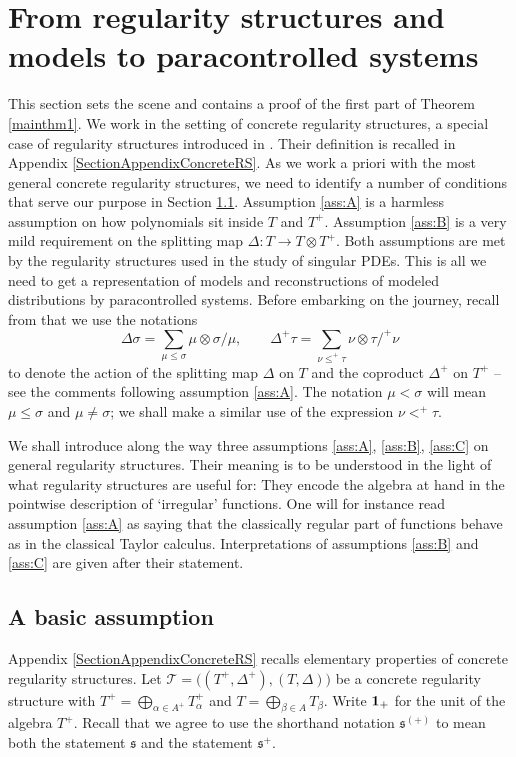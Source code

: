 \documentclass[JEP,XML,SOM,Unicode,published]{cedram}
\theoremstyle{plain}
\theoremstyle{definition}
\newcommand{\scrT}{\mathscr{T}}
\newcommand{\frks}{\mathfrak{s}}
\begin{document}
\section{From regularity structures and models to paracontrolled systems}
\label{SectionRStoPC}

This section sets the scene and contains a proof of the first part of Theorem \ref{mainthm1}. We work in the setting of concrete regularity structures, a special case of regularity structures introduced in \cite{BH}. Their definition is recalled in Appendix \ref{SectionAppendixConcreteRS}. As we work a priori with the most general concrete regularity structures, we need to identify a number of conditions that serve our purpose in Section \ref{SubsectionBasicAssump}. Assumption \eqref{ass:A} is a harmless assumption on how polynomials sit inside $T$ and $T^+$. Assumption \eqref{ass:B} is a very mild requirement on the splitting map $\Delta : T\to T\otimes T^+$. Both assumptions are met by the regularity structures used in the study of singular PDEs. This is all we need to get a representation of models and reconstructions of modeled distributions by paracontrolled systems. Before embarking on the journey, recall from \cite{BH} that we use the notations
\[
\Delta\sigma = \sum_{\mu\leq\sigma} \mu\otimes\sigma/\mu, \qquad \Delta^+\tau = \sum_{\nu\leq^+\tau} \nu\otimes\tau/^+\nu
\]
to denote the action of the splitting map $\Delta$ on $T$ and the coproduct $\Delta^+$ on $T^+$ -- see the comments following assumption \eqref{ass:A}. The notation $\mu<\sigma$ will mean $\mu\leq \sigma$ and $\mu\neq\sigma$; we shall make a similar use of the expression $\nu<^+\tau$.

We shall introduce along the way three assumptions \eqref{ass:A}, \eqref{ass:B}, \eqref{ass:C} on general regularity structures. Their meaning is to be understood in the light of what regularity structures are useful for: They encode the algebra at hand in the pointwise description of `irregular' functions. One will for instance read assumption \eqref{ass:A} as saying that the classically regular part of functions behave as in the classical Taylor calculus. Interpretations of assumptions \eqref{ass:B} and \eqref{ass:C} are given after their statement.

\subsection{A basic assumption}
\label{SubsectionBasicAssump}

Appendix \ref{SectionAppendixConcreteRS} recalls elementary properties of concrete regularity structures. Let $\scrT=\bigl((T^+,\Delta^+),(T,\Delta)\bigr)$ be a concrete regularity structure with $T^+ = \bigoplus_{\alpha\in A^+}T_\alpha^+$ and $T=\bigoplus_{\beta\in A} T_\beta$. Write ${\bf 1}_+$ for the unit of the algebra $T^+$. Recall that we agree to use the shorthand notation $\frks^{(+)}$ to mean both the statement $\frks$ and the statement $\frks^+$.
\end{document}

